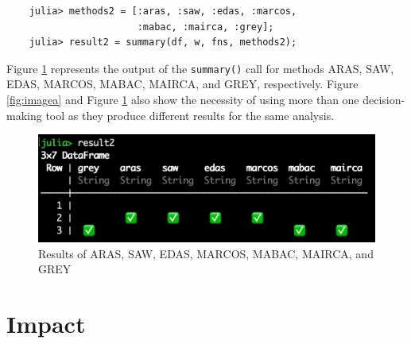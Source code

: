 \documentclass[preprint,review, 12pt, a4paper]{elsarticle}
\begin{document}
\begin{verbatim}
	julia> methods2 = [:aras, :saw, :edas, :marcos, 
	                   :mabac, :mairca, :grey];
	julia> result2 = summary(df, w, fns, methods2);
\end{verbatim}

Figure \ref{fig:imageb} represents the output of the \texttt{summary()} call for methods ARAS, SAW, EDAS, MARCOS, MABAC, MAIRCA, and GREY, respectively. Figure \ref{fig:imagea} and Figure \ref{fig:imageb} also show the necessity of using more than one decision-making tool as they produce different results for the same analysis.


	\begin{figure}
		\includegraphics[width=\columnwidth]{images/result2}
		\caption{Results of ARAS, SAW, EDAS, MARCOS, MABAC, MAIRCA, and GREY}
		\label{fig:imageb}
		\end{figure}


\section{Impact}
\label{section:impact}
\end{document}
